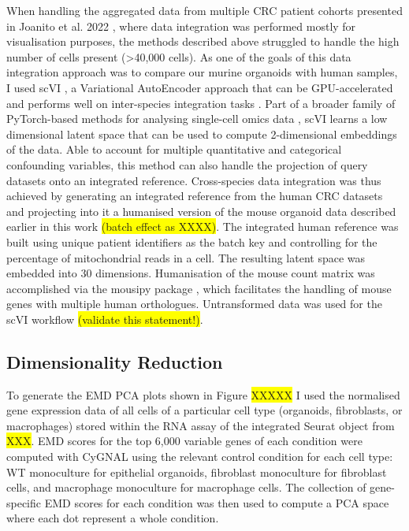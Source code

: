 When handling the aggregated data from multiple CRC patient cohorts presented in Joanito et al. 2022 \cite{joanito_single-cell_2022}, where data integration was performed mostly for visualisation purposes, the methods described above struggled to handle the high number of cells present (>40,000 cells). As one of the goals of this data integration approach was to compare our murine organoids with human samples, I used scVI \cite{lopez_deep_2018}, a Variational AutoEncoder approach that can be GPU-accelerated and performs well on inter-species integration tasks \cite{song_benchmarking_2023}. Part of a broader family of PyTorch-based methods for analysing single-cell omics data \cite{gayoso_python_2022}, scVI learns a low dimensional latent space that can be used to compute 2-dimensional embeddings of the data. Able to account for multiple quantitative and categorical confounding variables, this method can also handle the projection of query datasets onto an integrated reference.
Cross-species data integration was thus achieved by generating an integrated reference from the human CRC datasets and projecting into it a humanised version of the mouse organoid data described earlier in this work \colorbox{yellow}{(batch effect as XXXX)}. The integrated human reference was built using unique patient identifiers as the batch key and controlling for the percentage of mitochondrial reads in a cell. The resulting latent space was embedded into 30 dimensions. Humanisation of the mouse count matrix was accomplished via the mousipy package \cite{peidli_mousipy_2023}, which facilitates the handling of mouse genes with multiple human orthologues.
Untransformed data was used for the scVI workflow \colorbox{yellow}{(validate this statement!)}. 

\subsection*{Dimensionality Reduction}

To generate the EMD PCA plots shown in Figure \colorbox{yellow}{XXXXX} I used the normalised gene expression data of all cells of a particular cell type (organoids, fibroblasts, or macrophages) stored within the RNA assay of the integrated Seurat object from \colorbox{yellow}{XXX}. EMD scores for the top 6,000 variable genes of each condition were computed with CyGNAL \cite{ferran_cardoso_tape-labcygnal_2021} using the relevant control condition for each cell type: WT monoculture for epithelial organoids, fibroblast monoculture for fibroblast cells, and macrophage monoculture for macrophage cells. The collection of gene-specific EMD scores for each condition was then used to compute a PCA space where each dot represent a whole condition.

